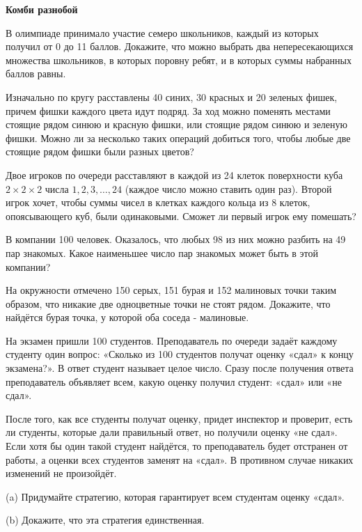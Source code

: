 \centerline{\bf \Huge Комби разнобой}

\begin{flushright}
        \scriptsize{}
\end{flushright}

В олимпиаде принимало участие семеро школьников, каждый из которых получил от 0 до 11 баллов. Докажите, что можно выбрать два непересекающихся множества школьников, в которых поровну ребят, и в которых суммы набранных баллов равны.

Изначально по кругу расставлены 40 синих, 30 красных и 20 зеленых фишек, причем фишки каждого цвета идут подряд. За ход можно поменять местами стоящие рядом синюю и красную фишки, или стоящие рядом синюю и зеленую фишки. Можно ли за несколько таких операций добиться того, чтобы любые две стоящие рядом фишки были разных цветов?

Двое игроков по очереди расставляют в каждой из 24 клеток поверхности куба $2 \times 2 \times 2$ числа $1,2,3, \ldots, 24$ (каждое число можно ставить один раз). Второй игрок хочет, чтобы суммы чисел в клетках каждого кольца из 8 клеток, опоясывающего куб, были одинаковыми. Сможет ли первый игрок ему помешать?

В компании 100 человек. Оказалось, что любых 98 из них можно разбить на 49 пар знакомых. Какое наименьшее число пар знакомых может быть в этой компании?

На окружности отмечено 150 серых, 151 бурая и 152 малиновых точки таким образом, что никакие две одноцветные точки не стоят рядом. Докажите, что найдётся бурая точка, у которой оба соседа - малиновые.

На экзамен пришли 100 студентов. Преподаватель по очереди задаёт каждому студенту один вопрос: «Сколько из 100 студентов получат оценку «сдал» к концу экзамена?». В ответ студент называет целое число. Сразу после получения ответа преподаватель объявляет всем, какую оценку получил студент: «сдал» или «не сдал».

После того, как все студенты получат оценку, придет инспектор и проверит, есть ли студенты, которые дали правильный ответ, но получили оценку «не сдал». Если хотя бы один такой студент найдётся, то преподаватель будет отстранен от работы, а оценки всех студентов заменят на «сдал». В противном случае никаких изменений не произойдёт.

(a) Придумайте стратегию, которая гарантирует всем студентам оценку «сдал».

(b) Докажите, что эта стратегия единственная.